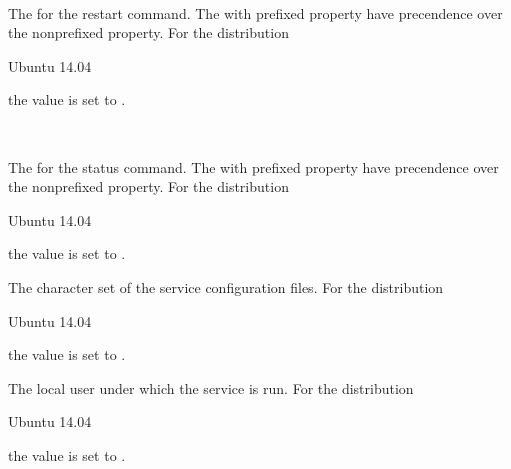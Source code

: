 \\

The  for the restart command. The with  prefixed 
property have precendence over the nonprefixed property.
For the distribution
\begin{inparaitem}
\item[\TheDistribution{ubuntu}] Ubuntu 14.04
\end{inparaitem}
the value is set to .

\\

The  for the status command. The with  prefixed 
property have precendence over the nonprefixed property.
For the distribution
\begin{inparaitem}
\item[\TheDistribution{ubuntu}] Ubuntu 14.04
\end{inparaitem}
the value is set to .


The character set  of the service configuration files. 
For the distribution
\begin{inparaitem}
\item[\TheDistribution{ubuntu}] Ubuntu 14.04
\end{inparaitem}
the value is set to .


The local user  under which the service is run.
For the distribution
\begin{inparaitem}
\item[\TheDistribution{ubuntu}] Ubuntu 14.04
\end{inparaitem}
the value is set to .


